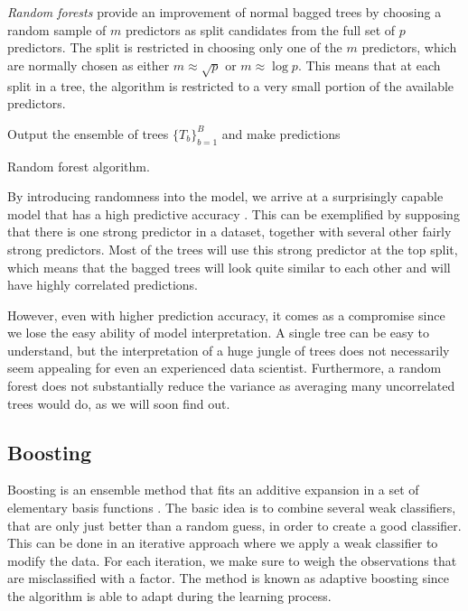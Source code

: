 \textit{Random forests} provide an improvement of normal bagged trees by choosing a random sample of $m$ predictors as split candidates from the full set of $p$ predictors. The split is restricted in choosing only one of the $m$ predictors, which are normally chosen as either $m \approx \sqrt{p} $ or $m \approx \log{p}$. This means that at each split in a tree, the algorithm is restricted to a very small portion of the available predictors. %

\begin{algorithm}[H]
\SetAlgoLined
 Output the ensemble of trees $\{T_b\}_{b=1}^B$ and make predictions
 \caption{Random forest algorithm.}
 \label{alg:randomforest}
\end{algorithm}

\noindent By introducing randomness into the model, we arrive at a surprisingly capable model that has a high predictive accuracy \cite{Caruana2006}. This can be exemplified by supposing that there is one strong predictor in a dataset, together with several other fairly strong predictors. Most of the trees will use this strong predictor at the top split, which means that the bagged trees will look quite similar to each other and will have highly correlated predictions.

However, even with higher prediction accuracy, it comes as a compromise since we lose the easy ability of model interpretation. A single tree can be easy to understand, but the interpretation of a huge jungle of trees does not necessarily seem appealing for even an experienced data scientist. Furthermore, a random forest does not substantially reduce the variance as averaging many uncorrelated trees would do, as we will soon find out.

\subsection{Boosting}

Boosting is an ensemble method that fits an additive expansion in a set of elementary basis functions \cite{Murphy2012}. The basic idea is to combine several weak classifiers, that are only just better than a random guess, in order to create a good classifier. This can be done in an iterative approach where we apply a weak classifier to modify the data. For each iteration, we make sure to weigh the observations that are misclassified with a factor. The method is known as adaptive boosting since the algorithm is able to adapt during the learning process.

